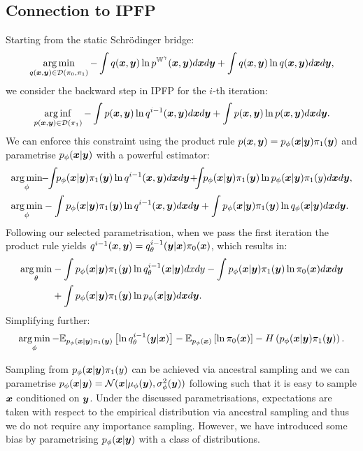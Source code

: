 \documentclass[a4paper,12pt,twoside,openright]{report}
\theoremstyle{definition}
\begin{document}
\subsection{Connection to IPFP}
Starting from the static Schrödinger bridge: 
\begin{align*}
\operatorname*{arg\,min}_{q({\bm{x}},{\bm{y}}) \in \mathcal{D}(\pi_0, \pi_1)}- \int q({\bm{x}},{\bm{y}}) \operatorname{ln} p^{\mathbb{W}^{\gamma}}({\bm{x}} ,{\bm{y}} )d{\bm{x}} d{\bm{y}} +\int q({\bm{x}},{\bm{y}}) \operatorname{ln} q({\bm{x}} ,{\bm{y}} )d{\bm{x}} d{\bm{y}},
\end{align*}
we consider the backward step in IPFP for the $i$-th iteration:
\begin{align*}
\operatorname*{arg\,inf}_{p({\bm{x}},{\bm{y}})  \in \mathcal{D}(\pi_1)}- \int p({\bm{x}},{\bm{y}})  \operatorname{ln} q^{i-1}({\bm{x}},{\bm{y}})d{\bm{x}} d{\bm{y}} +\int  p({\bm{x}},{\bm{y}}) \operatorname{ln}  p({\bm{x}},{\bm{y}}) d{\bm{x}} d{\bm{y}}.
\end{align*}
We can enforce this constraint using the product rule $p({\bm{x}},{\bm{y}}) = p_{\phi}({\bm{x}}|{\bm{y}}) \pi_1({\bm{y}})$  and parametrise $p_{\phi}({\bm{x}}|{\bm{y}})$ with a powerful estimator:
\begin{align*}
\argmin_{\phi}&\!\!-\!\!\int\!\!p_{\phi}(\vx|\vy) \pi_1(\vy) \log q^{i-1}(\vx,\vy)d\vx d\vy\!+\!\!\!\int\!\!p_{\phi}(\vx|\vy) \pi_1(\vy) \log p_{\phi}(\vx|\vy)
\pi_1(y)d\vx d\vy,\\
\argmin_{\phi}&- \int p_{\phi}(\vx|\vy) \pi_1(\vy) \log q^{i-1}(\vx,\vy)d\vx d\vy +\int p_{\phi}(\vx|\vy)\pi_1(\vy) \log q_{\phi}(\vx|\vy)
d\vx d\vy.
\end{align*}
Following our selected parametrisation, when we pass the first iteration the product rule yields $q^{i-1}({\bm{x}} , {\bm{y}})= q^{i-1}_{\theta}({\bm{y}}|{\bm{x}})\pi_0({\bm{x}})$, which results in:
\begin{align*}
\operatorname*{arg\,min}_\theta&- \int p_{\phi}({\bm{x}}|{\bm{y}}) \pi_1({\bm{y}}) \operatorname{ln}  q^{i-1}_{\theta}({\bm{x}}|{\bm{y}})dxdy - \int p_{\phi}({\bm{x}}|{\bm{y}}) \pi_1({\bm{y}}) \operatorname{ln}  \pi_0({\bm{x}}) d{\bm{x}} d{\bm{y}} \\
&+\int p_{\phi}({\bm{x}}|{\bm{y}}) \pi_1({\bm{y}}) \operatorname{ln} p_{\phi}({\bm{x}}|{\bm{y}})d{\bm{x}} d{\bm{y}}.
\end{align*}
Simplifying further:
\begin{align*}
\operatorname*{arg\,min}_\phi- \mathbb{E}_{p_{\phi}({\bm{x}}|{\bm{y}})\pi_1({\bm{y}})}\left[  \operatorname{ln}  q^{i-1}_{\theta}({\bm{y}}|{\bm{x}})\right] -  \mathbb{E}_{p_{\phi}({\bm{x}})}\left[ \operatorname{ln}  \pi_0({\bm{x}}) \right] - H\left(p_{\phi}({\bm{x}}|{\bm{y}})\pi_1({\bm{y}})\right).
\end{align*}

Sampling from $p_{\phi}({\bm{x}}|{\bm{y}})\pi_1(y)$ can be achieved via  ancestral sampling and we can parametrise $p_{\phi}({\bm{x}}|{\bm{y}})={\mathcal{N}}({\bm{x}} | \mu_{\phi}({\bm{y}}), \sigma^2_\phi({\bm{y}}))$ following \cite{kingma2013auto} such that it is easy to sample ${\bm{x}}$ conditioned on ${\bm{y}}$. Under the discussed parametrisations, expectations are taken with respect to the empirical distribution via ancestral sampling and thus we do not require any importance sampling. However, we have introduced some bias by parametrising $p_{\phi}({\bm{x}}|{\bm{y}})$ with a class of distributions.
\end{document}
